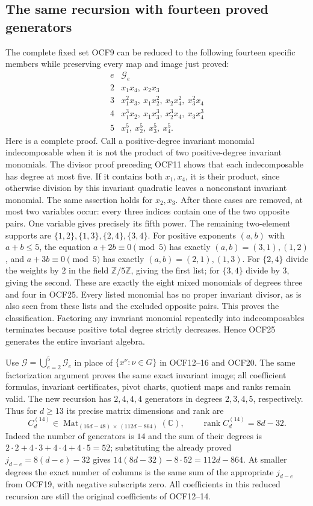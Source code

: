 \documentclass[11pt]{article}
\begin{document}
\subsection{The same recursion with fourteen proved generators}

The complete fixed set OCF9 can be reduced to the following
fourteen specific members while preserving every map and image
just proved:
\[
\begin{array}{c|l}
e&\mathcal G_e\\\hline
2&x_1x_4,\ x_2x_3\\
3&x_1^2x_3,\ x_1x_2^2,\ x_2x_4^2,\ x_3^2x_4\\
4&x_1^3x_2,\ x_1x_3^3,\ x_2^3x_4,\ x_3x_4^3\\
5&x_1^5,\ x_2^5,\ x_3^5,\ x_4^5 .
\end{array}\tag{OCF25}
\]
Here is a complete proof. Call a positive-degree invariant
monomial indecomposable when it is not the product of two
positive-degree invariant monomials. The divisor proof preceding
OCF11 shows that each indecomposable has degree at most five.
If it contains both $x_1,x_4$, it is their product, since otherwise
division by this invariant quadratic leaves a nonconstant
invariant monomial. The same assertion holds for $x_2,x_3$.
After these cases are removed, at most two variables occur:
every three indices contain one of the two opposite pairs.
One variable gives precisely its fifth power. The remaining
two-element supports are $\{1,2\},\{1,3\},\{2,4\},\{3,4\}$.
For positive exponents $(a,b)$ with $a+b\leq5$, the equation
$a+2b\equiv0\pmod5$ has exactly $(a,b)=(3,1),(1,2)$, and
$a+3b\equiv0\pmod5$ has exactly $(a,b)=(2,1),(1,3)$.
For $\{2,4\}$ divide the weights by $2$ in the field
$\mathbb Z/5\mathbb Z$, giving the first list; for $\{3,4\}$
divide by $3$, giving the second. These are exactly the eight
mixed monomials of degrees three and four in OCF25. Every
listed monomial has no proper invariant divisor, as is also
seen from these lists and the excluded opposite pairs.
This proves the classification. Factoring any invariant
monomial repeatedly into indecomposables terminates because
positive total degree strictly decreases. Hence OCF25 generates
the entire invariant algebra.

Use $\mathcal G=\bigcup_{e=2}^5\mathcal G_e$ in place of
$\{x^\nu:\nu\in G\}$ in OCF12--16 and OCF20. The same
factorization argument proves the same exact invariant image;
all coefficient formulas, invariant certificates, pivot charts,
quotient maps and ranks remain valid. The new recursion has
$2,4,4,4$ generators in degrees $2,3,4,5$, respectively. Thus
for $d\geq13$ its precise matrix dimensions and rank are
\[
 C_d^{(14)}\in
 \operatorname{Mat}_{(16d-48)\,\times\,(112d-864)}(\mathbb C),
 \qquad \operatorname{rank}C_d^{(14)}=8d-32.
 \tag{OCF26}
\]
Indeed the number of generators is $14$ and the sum of their
degrees is $2\cdot2+4\cdot3+4\cdot4+4\cdot5=52$; substituting
the already proved $j_{d-e}=8(d-e)-32$ gives
$14(8d-32)-8\cdot52=112d-864$. At smaller degrees the exact
number of columns is the same sum of the appropriate $j_{d-e}$
from OCF19, with negative subscripts zero. All coefficients
in this reduced recursion are still the original coefficients
of OCF12--14.
\end{document}
